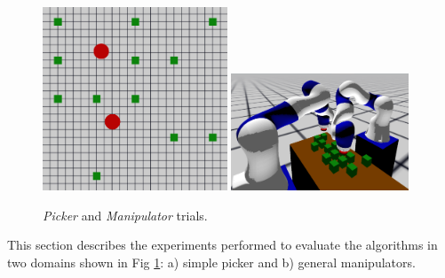 %

\begin{figure}[b]
	\centering
		\includegraphics[width=0.49\textwidth,trim={1cm 9cm 1cm 5cm},clip]{figures/simple_picker_benchmark}
		\includegraphics[width=0.47\textwidth]{figures/kuka_benchmark2}
		\caption{\textit{Picker} and \textit{Manipulator} trials.}
		\label{fig:benchmarks}
\end{figure}
This section describes the experiments performed to evaluate the algorithms in two  domains shown in Fig \ref{fig:benchmarks}: a) simple picker and b) general manipulators.
